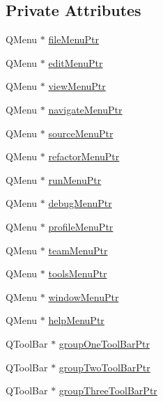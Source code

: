 \subsection*{Private Attributes}
\begin{DoxyCompactItemize}
\item 
Q\-Menu $\ast$ \hyperlink{class_master_gui_a1d768ad74ddb657928df8539c356abb6}{file\-Menu\-Ptr}
\item 
Q\-Menu $\ast$ \hyperlink{class_master_gui_aeb708f257518fb47d567d1130bfc7f7f}{edit\-Menu\-Ptr}
\item 
Q\-Menu $\ast$ \hyperlink{class_master_gui_acb6a42ddb59a05f60ab7aa2a9fdddbc8}{view\-Menu\-Ptr}
\item 
Q\-Menu $\ast$ \hyperlink{class_master_gui_aec75bd894b1c0eecea35c67ecdfcf1b0}{navigate\-Menu\-Ptr}
\item 
Q\-Menu $\ast$ \hyperlink{class_master_gui_a3ffd8337f87c7c6eca6b4740fa8d1c57}{source\-Menu\-Ptr}
\item 
Q\-Menu $\ast$ \hyperlink{class_master_gui_a44e789008fcc276a7a4294beb98d02c7}{refactor\-Menu\-Ptr}
\item 
Q\-Menu $\ast$ \hyperlink{class_master_gui_ae5b13b338972e99f29e623d258088b07}{run\-Menu\-Ptr}
\item 
Q\-Menu $\ast$ \hyperlink{class_master_gui_ac1efdb45cdde47584625a8026166c316}{debug\-Menu\-Ptr}
\item 
Q\-Menu $\ast$ \hyperlink{class_master_gui_a9c0ef6beee1cb9afcfff786bc4c6bd06}{profile\-Menu\-Ptr}
\item 
Q\-Menu $\ast$ \hyperlink{class_master_gui_ad1d5b1e487d4695bab91ab0db856d795}{team\-Menu\-Ptr}
\item 
Q\-Menu $\ast$ \hyperlink{class_master_gui_ab751e75ffdf91f5b90b4c2900975f308}{tools\-Menu\-Ptr}
\item 
Q\-Menu $\ast$ \hyperlink{class_master_gui_ae33b742ac5529096317c8096984ffef1}{window\-Menu\-Ptr}
\item 
Q\-Menu $\ast$ \hyperlink{class_master_gui_a4125e9702c79a263642bf83f5f1e2192}{help\-Menu\-Ptr}
\item 
Q\-Tool\-Bar $\ast$ \hyperlink{class_master_gui_a67441e41e16e245976536f18cd7f2d6d}{group\-One\-Tool\-Bar\-Ptr}
\item 
Q\-Tool\-Bar $\ast$ \hyperlink{class_master_gui_aa2c7522e568a43f38861795af343bf76}{group\-Two\-Tool\-Bar\-Ptr}
\item 
Q\-Tool\-Bar $\ast$ \hyperlink{class_master_gui_af620c7fd8a0903c84581a657d23ef45b}{group\-Three\-Tool\-Bar\-Ptr}
\item 

\end{DoxyCompactItemize}
